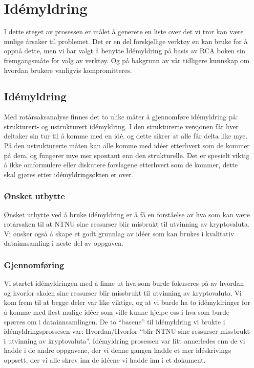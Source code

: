 \chapter{Idémyldring}
I dette steget av prosessen er målet å generere en liste over det vi tror kan være mulige årsaker til problemet. Det er en del forskjellige verktøy en kan bruke for å oppnå dette, men vi har valgt å benytte Idémyldring på basis av RCA boken \cite{RCA} sin fremgangsmåte for valg av verktøy. Og på bakgrunn av vår tidligere kunnskap om hvordan brukere vanligvis kompromitteres. 

\section{Idémyldring}
Med rotårsaksanalyse finnes det to ulike måter å gjennomføre idémyldring på: strukturert- og ustrukturert idémyldring. I den strukturerte versjonen får hver deltaker sin tur til å komme med en idé, og dette sikrer at alle får delta like mye. På den ustrukturerte måten kan alle komme med idéer etterhvert som de kommer på dem, og fungerer mye mer spontant enn den strukturelle. Det er spesielt viktig å ikke omformulere eller diskutere forslagene etterhvert som de kommer, dette skal gjøres etter idémyldringsøkten er over.

\subsection{Ønsket utbytte}
Ønsket utbytte ved å bruke idémyldring er å få en forståelse av hva som kan være rotårsaken til at NTNU sine ressurser blir misbrukt til utvinning av kryptovaluta. Vi ønsker også å skape et godt grunnlag av idéer som kan brukes i kvalitativ datainnsamling i neste del av oppgaven.

\subsection{Gjennomføring}
Vi startet idémyldringen med å finne ut hva som burde fokuseres på av hvordan og hvorfor skolen sine ressurser blir missbrukt til utvinning av kryptovaluta. Vi kom frem til at begge deler var like viktige, og at vi burde ha to idémyldringer for å komme med flest mulige idéer som ville kunne hjelpe oss i hva som burde spørres om i datainnsamlingen. De to ``basene'' til idémyldring vi brukte i idémyldringsprossesen var:  Hvordan/Hvorfor ``blir NTNU sine ressurser missbrukt i utvinning av kryptovaluta''. Idémyldring prosessen var litt annerledes enn de vi hadde i de andre oppgavene, der vi denne gangen hadde et mer idéskrivings oppsett, der vi alle skrev inn de idéene vi hadde inn i et dokument.

